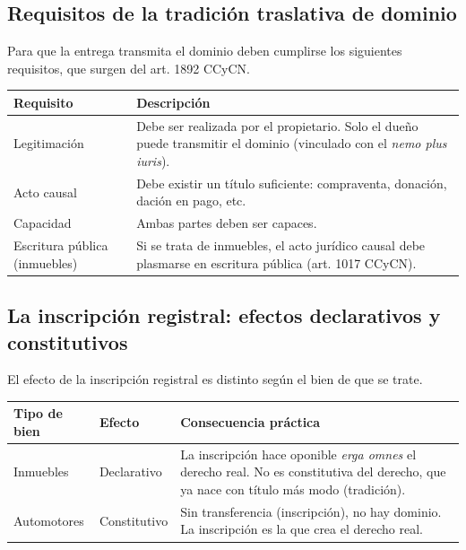 \documentclass[12pt,oneside]{book}
\begin{document}
\subsection{Requisitos de la tradición traslativa de dominio}

Para que la entrega transmita el dominio deben cumplirse los siguientes requisitos, que surgen del art. 1892 CCyCN.

\begin{center}
\small
\renewcommand{\arraystretch}{1.3}
\begin{tabularx}{\textwidth}{@{}>{\raggedright\arraybackslash}p{}>{\raggedright\arraybackslash}X@{}}
\toprule
\textbf{Requisito} & \textbf{Descripción} \\
\midrule
Legitimación & Debe ser realizada por el propietario. Solo el dueño puede transmitir el dominio (vinculado con el \textit{nemo plus iuris}). \\
Acto causal & Debe existir un título suficiente: compraventa, donación, dación en pago, etc. \\
Capacidad & Ambas partes deben ser capaces. \\
Escritura pública (inmuebles) & Si se trata de inmuebles, el acto jurídico causal debe plasmarse en escritura pública (art. 1017 CCyCN). \\
\bottomrule
\end{tabularx}
\end{center}

\subsection{La inscripción registral: efectos declarativos y constitutivos}

El efecto de la inscripción registral es distinto según el bien de que se trate.

\begin{center}
\small
\renewcommand{\arraystretch}{1.3}
\begin{tabularx}{\textwidth}{@{}>{\raggedright\arraybackslash}p{}>{\raggedright\arraybackslash}p{}>{\raggedright\arraybackslash}X@{}}
\toprule
\textbf{Tipo de bien} & \textbf{Efecto} & \textbf{Consecuencia práctica} \\
\midrule
Inmuebles & Declarativo & La inscripción hace oponible \textit{erga omnes} el derecho real. No es constitutiva del derecho, que ya nace con título más modo (tradición). \\
Automotores & Constitutivo & Sin transferencia (inscripción), no hay dominio. La inscripción es la que crea el derecho real. \\
\bottomrule
\end{tabularx}
\end{center}
\end{document}
